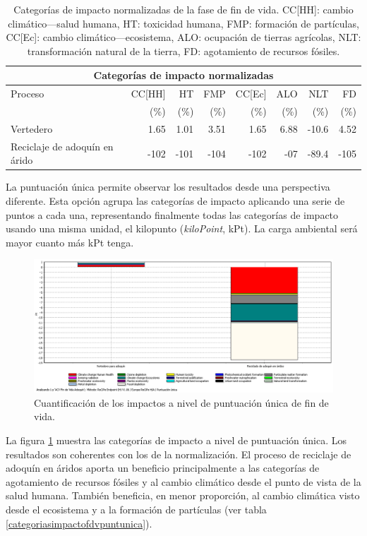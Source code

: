 \begin{table}[!htb]
\centering
\begin{tabular}{p{4cm}rrrrrrr}
\toprule
\multicolumn{8}{c}{Categorías de impacto normalizadas}\\
\midrule
Proceso & CC[HH] & HT & FMP & CC[Ec] & ALO & NLT & FD\\
 &  (\%) & (\%) & (\%) & (\%) & (\%) & (\%) & (\%)\\
\midrule
Vertedero & 1.65 & 1.01 & 3.51 & 1.65 & 6.88 & -10.6 & 4.52\\
Reciclaje de adoquín en árido & -102 & -101 & -104 & -102 & -07 & -89.4 & -105\\
\bottomrule
\end{tabular}
\caption[Categorías de impacto normalizadas de la fase de fin de vida.]{Categorías de impacto normalizadas de la fase de fin de vida. CC[HH]: cambio climático—salud humana, HT: toxicidad humana, FMP: formación de partículas, CC[Ec]: cambio climático—ecosistema, ALO: ocupación de tierras agrícolas, NLT: transformación natural de la tierra, FD: agotamiento de recursos fósiles.}
\label{categoriasimpactofdv}
\end{table}

La puntuación única permite observar los resultados desde una perspectiva diferente. Esta opción agrupa las categorías de impacto aplicando una serie de puntos a cada una, representando finalmente todas las categorías de impacto usando una misma unidad, el kilopunto (\textit{kiloPoint}, kPt). La carga ambiental será mayor cuanto más kPt tenga.

\begin{figure}[!htb]
\centering
\includegraphics[width=15cm]{img/fdv_puntuacionunica.png}
\caption{Cuantificación de los impactos a nivel de puntuación única de fin de vida.}
\label{fig:fdv_puntuacionunica}
\end{figure}

La figura \ref{fig:fdv_puntuacionunica} muestra las categorías de impacto a nivel de puntuación única. Los resultados son coherentes con los de la normalización. El proceso de reciclaje de adoquín en áridos aporta un beneficio principalmente a las categorías de agotamiento de recursos fósiles y al cambio climático desde el punto de vista de la salud humana. También beneficia, en menor proporción, al cambio climática visto desde el ecosistema y a la formación de partículas (ver tabla \ref{categoriasimpactofdvpuntunica}).

